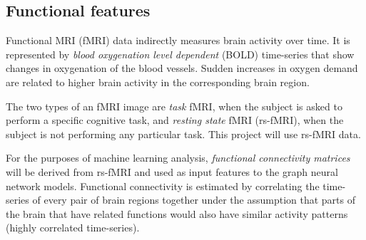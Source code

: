 
\subsection{Functional features}
\label{fmri}

Functional MRI (fMRI) data indirectly measures brain activity over time. It is represented by \textit{blood oxygenation level dependent} (BOLD) time-series that show changes in oxygenation of the blood vessels. Sudden increases in oxygen demand are related to higher brain activity in the corresponding brain region.

The two types of an fMRI image are \textit{task} fMRI, when the subject is asked to perform a specific cognitive task, and \textit{resting state} fMRI (rs-fMRI), when the subject is not performing any particular task. This project will use rs-fMRI data.

For the purposes of machine learning analysis, \textit{functional connectivity matrices} will be derived from rs-fMRI and used as input features to the graph neural network models. Functional connectivity is estimated by correlating the time-series of every pair of brain regions together under the assumption that parts of the brain that have related functions would also have similar activity patterns (highly correlated time-series). 







